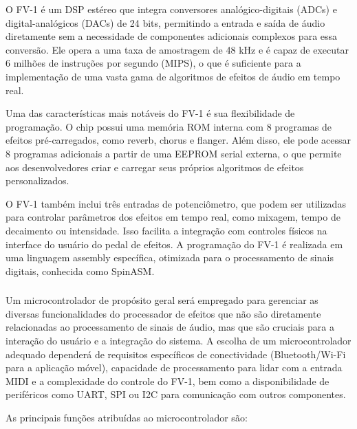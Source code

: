 O FV-1 é um DSP estéreo que integra conversores analógico-digitais (ADCs) e digital-analógicos (DACs) de 24 bits, permitindo a entrada e saída de áudio diretamente sem a necessidade de componentes adicionais complexos para essa conversão. Ele opera a uma taxa de amostragem de 48 kHz e é capaz de executar 6 milhões de instruções por segundo (MIPS), o que é suficiente para a implementação de uma vasta gama de algoritmos de efeitos de áudio em tempo real.

Uma das características mais notáveis do FV-1 é sua flexibilidade de programação. O chip possui uma memória ROM interna com 8 programas de efeitos pré-carregados, como reverb, chorus e flanger. Além disso, ele pode acessar 8 programas adicionais a partir de uma EEPROM serial externa, o que permite aos desenvolvedores criar e carregar seus próprios algoritmos de efeitos personalizados. 

O FV-1 também inclui três entradas de potenciômetro, que podem ser utilizadas para controlar parâmetros dos efeitos em tempo real, como mixagem, tempo de decaimento ou intensidade. Isso facilita a integração com controles físicos na interface do usuário do pedal de efeitos. A programação do FV-1 é realizada em uma linguagem assembly específica, otimizada para o processamento de sinais digitais, conhecida como SpinASM. 

\subsubsection{}

Um microcontrolador de propósito geral será empregado para gerenciar as diversas funcionalidades do processador de efeitos que não são diretamente relacionadas ao processamento de sinais de áudio, mas que são cruciais para a interação do usuário e a integração do sistema. A escolha de um microcontrolador adequado dependerá de requisitos específicos de conectividade (Bluetooth/Wi-Fi para a aplicação móvel), capacidade de processamento para lidar com a entrada MIDI e a complexidade do controle do FV-1, bem como a disponibilidade de periféricos como UART, SPI ou I2C para comunicação com outros componentes.

As principais funções atribuídas ao microcontrolador são:

\subsubsection{}

